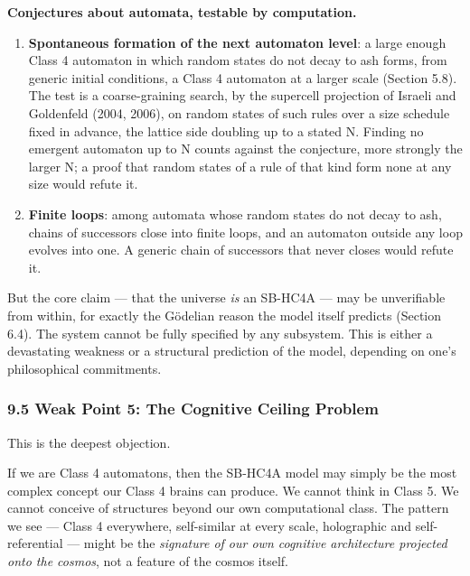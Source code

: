\documentclass[
]{article}
\begin{document}
\textbf{Conjectures about automata, testable by computation.}

\begin{enumerate}
\def\labelenumi{(\alph{enumi})}
\setcounter{enumi}{7}
\item
  \textbf{Spontaneous formation of the next automaton level}: a large
  enough Class 4 automaton in which random states do not decay to ash
  forms, from generic initial conditions, a Class 4 automaton at a
  larger scale (Section 5.8). The test is a coarse-graining search, by
  the supercell projection of Israeli and Goldenfeld (2004, 2006), on
  random states of such rules over a size schedule fixed in advance, the
  lattice side doubling up to a stated N. Finding no emergent automaton
  up to N counts against the conjecture, more strongly the larger N; a
  proof that random states of a rule of that kind form none at any size
  would refute it.
\item
  \textbf{Finite loops}: among automata whose random states do not decay
  to ash, chains of successors close into finite loops, and an automaton
  outside any loop evolves into one. A generic chain of successors that
  never closes would refute it.
\end{enumerate}

But the core claim --- that the universe \emph{is} an SB-HC4A --- may be
unverifiable from within, for exactly the Gödelian reason the model
itself predicts (Section 6.4). The system cannot be fully specified by
any subsystem. This is either a devastating weakness or a structural
prediction of the model, depending on one's philosophical commitments.

\hypertarget{weak-point-5-the-cognitive-ceiling-problem}{%
\subsubsection{9.5 Weak Point 5: The Cognitive Ceiling
Problem}\label{weak-point-5-the-cognitive-ceiling-problem}}

This is the deepest objection.

If we are Class 4 automatons, then the SB-HC4A model may simply be the
most complex concept our Class 4 brains can produce. We cannot think in
Class 5. We cannot conceive of structures beyond our own computational
class. The pattern we see --- Class 4 everywhere, self-similar at every
scale, holographic and self-referential --- might be the \emph{signature
of our own cognitive architecture projected onto the cosmos}, not a
feature of the cosmos itself.
\end{document}
